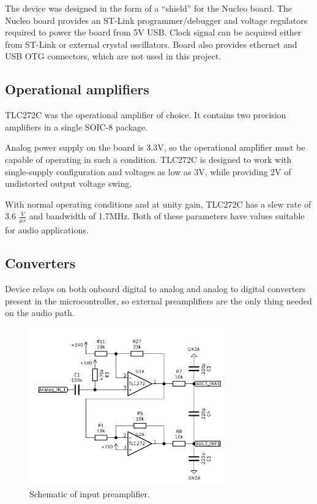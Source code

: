 \documentclass[a4paper,twoside,12pt]{book}
\begin{document}
The device was designed in the form of a “shield” for the Nucleo board.
The Nucleo board provides an ST-Link programmer/debugger
and voltage regulators required to power the board from 5V USB.
Clock signal can be acquired either from ST-Link or
external crystal oscillators.
Board also provides ethernet and USB OTG connectors,
which are not used in this project.

\subsection {Operational amplifiers}
TLC272C was the operational amplifier of choice\cite{TI:TLC272}.
It contains two precision amplifiers in a single SOIC-8 package.

Analog power supply on the board is 3.3V, so the operational amplifier
must be capable of operating in such a condition.
TLC272C is designed to work with single-supply configuration
and voltages as low as 3V,
while providing 2V of undistorted output voltage swing.

With normal operating conditions and at unity gain,
TLC272C has a slew rate of 3.6 \(\frac{V}{\mu s}\) and bandwidth of 1.7MHz.
Both of these parameters have values suitable for audio applications.

\subsection{Converters}
Device relays on both onboard digital to analog
and analog to digital converters present in the microcontroller,
so external preamplifiers are the only thing needed on the audio path.

\begin{figure}[H]
    \centering
    \includegraphics[width=0.75\textwidth]{images/Input_preamp}
    \caption{Schematic of input preamplifier.}
    \label{fig:input}
\end{figure}
\end{document}
